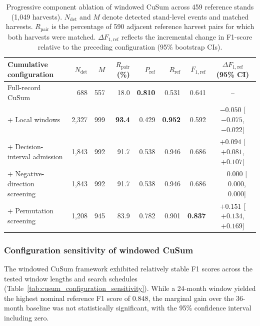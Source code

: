 \begin{table}[pos=!htbp]
    \centering
    \small
    \setlength{\tabcolsep}{4pt}
    \caption{Progressive component ablation of windowed CuSum across 459 reference stands (1,049 harvests). $N_{\mathrm{det}}$ and $M$ denote detected stand-level events and matched harvests. $R_{\mathrm{pair}}$ is the percentage of 590 adjacent reference harvest pairs for which both harvests were matched. $\Delta F_{1,\mathrm{ref}}$ reflects the incremental change in F1-score relative to the preceding configuration (95\% bootstrap CIs).}
    \label{tab:component_ablation}
    \begin{tabular*}{\linewidth}{@{\extracolsep{\fill}}lrrrrrrc@{}}
        \toprule
        Cumulative configuration &
        $N_{\mathrm{det}}$ &
        $M$ &
        $R_{\mathrm{pair}}$ (\%) &
        $P_{\mathrm{ref}}$ &
        $R_{\mathrm{ref}}$ &
        $F_{1,\mathrm{ref}}$ &
        $\Delta F_{1,\mathrm{ref}}$ (95\% CI) \\
        \midrule
        Full-record CuSum
        & 688 & 557 & 18.0 & \textbf{0.810} & 0.531 & 0.641 & -- \\
        + Local windows
        & 2,327 & 999 & \textbf{93.4} & 0.429 & \textbf{0.952} & 0.592 & $-0.050$ [$-0.075$, $-0.022$] \\
        + Decision-interval admission
        & 1,843 & 992 & 91.7 & 0.538 & 0.946 & 0.686 & $+0.094$ [$+0.081$, $+0.107$] \\
        + Negative-direction screening
        & 1,843 & 992 & 91.7 & 0.538 & 0.946 & 0.686 & $\phantom{+}0.000$ [$\phantom{+}0.000$, $\phantom{+}0.000$] \\
        + Permutation screening
        & 1,208 & 945 & 83.9 & 0.782 & 0.901 & \textbf{0.837} & $+0.151$ [$+0.134$, $+0.169$] \\
        \bottomrule
    \end{tabular*}
\end{table}


\subsubsection{Configuration sensitivity of windowed CuSum}
\label{sec:cusum_configuration_sensitivity}

The windowed CuSum framework exhibited relatively stable F1 scores across the tested window lengths and search schedules (Table~\ref{tab:cusum_configuration_sensitivity}). While a 24-month window yielded the highest nominal reference F1 score of 0.848, the marginal gain over the 36-month baseline was not statistically significant, with the 95\% confidence interval including zero.

